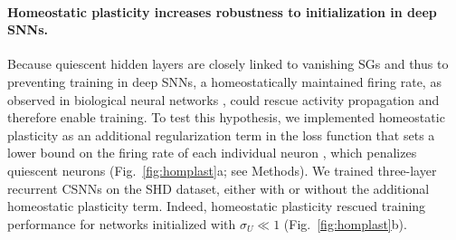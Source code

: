 \documentclass[11pt,a4paper]{article}
\begin{document}
\paragraph{Homeostatic plasticity increases robustness to initialization in deep \acp{SNN}.}
Because quiescent hidden layers are closely linked to vanishing \acp{SG} and thus to preventing training in deep \acp{SNN}, a homeostatically maintained firing rate, as observed in biological neural networks \cite{turrigiano_homeostatic_2012, gjorgjieva_homeostatic_2016, zenke_hebbian_2017}, could rescue activity propagation and therefore enable training. 
To test this hypothesis, we implemented homeostatic plasticity as an additional regularization term in the loss function that sets a lower bound on the firing rate of each individual neuron \citealp{cramer_heidelberg_2020}, which penalizes quiescent neurons (Fig.~\ref{fig:homplast}a; see Methods). 
We trained three-layer recurrent \acp{CSNN} on the SHD dataset, either with or without the additional homeostatic plasticity term. 
Indeed, homeostatic plasticity rescued training performance for networks initialized with $\sigma_U \ll 1$ (Fig.~\ref{fig:homplast}b). 
\end{document}

